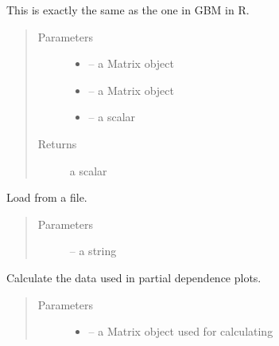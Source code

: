 \documentclass[letterpaper,10pt,english]{sphinxmanual}
\begin{document}
\begin{fulllineitems}
\begin{fulllineitems}
\end{fulllineitems}


\begin{fulllineitems}
\label{\detokenize{index:dbm_py.interface.AUTO_DBM.interact}}
This is exactly the same as the one in GBM in R.
\begin{quote}\begin{description}
\item[{Parameters}] \leavevmode\begin{itemize}
\item {} 
 -- a Matrix object

\item {} 
 -- a Matrix object

\item {} 
 -- a scalar

\end{itemize}

\item[{Returns}] \leavevmode
a scalar

\end{description}\end{quote}

\end{fulllineitems}


\begin{fulllineitems}
\label{\detokenize{index:dbm_py.interface.AUTO_DBM.load}}
Load from a file.
\begin{quote}\begin{description}
\item[{Parameters}] \leavevmode
{} -- a string

\end{description}\end{quote}

\end{fulllineitems}


\begin{fulllineitems}
\label{\detokenize{index:dbm_py.interface.AUTO_DBM.pdp}}
Calculate the data used in partial dependence plots.
\begin{quote}\begin{description}
\item[{Parameters}] \leavevmode\begin{itemize}
\item {} 
 -- a Matrix object used for calculating


\end{itemize}
\end{description}
\end{quote}
\end{fulllineitems}
\end{fulllineitems}
\end{document}
